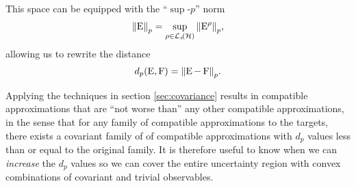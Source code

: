 This space can be equipped with the ``$\sup$-$p$'' norm
\begin{equation}
  \pnorm{\ope} =  \sup_{\rho\in\saops[\hcal]} \pnorm{\ope^\rho},
\end{equation}
allowing us to rewrite the distance
\begin{align}
  d_p(\ope, \opf) = \pnorm{\ope - \opf}.
\end{align}

Applying the techniques in section \ref{sec:covariance} results in compatible approximations that are ``not worse than'' any other compatible approximations, in the sense that for any family of compatible approximations to the targets, there exists a covariant family of of compatible approximations with $d_p$ values less than or equal to the original family. It is therefore useful to know when we can \emph{increase} the $d_p$ values so we can cover the entire uncertainty region with convex combinations of covariant and trivial observables.

